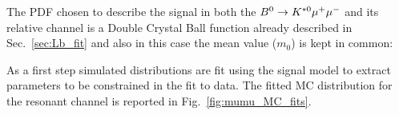 The PDF chosen to describe the signal in both the ${{B}^0} \rightarrow{\ensuremath{{K}^{*0}}}{\ensuremath{\mu^+\mu^-}}$ and its relative \jpsi channel 
is a Double Crystal Ball function already described in Sec.~\ref{sec:Lb_fit} and also in this case
the mean value ($m_0$) is kept in common:







As a first step simulated distributions are fit using the signal model to extract parameters to be
constrained in the fit to data.
The fitted MC distribution for the resonant channel is reported in Fig.~\ref{fig:mumu_MC_fits}.

